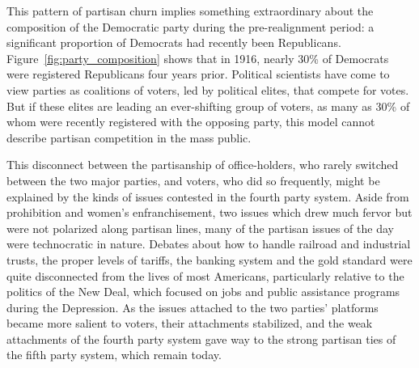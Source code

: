 \documentclass[11pt]{scrartcl}\usepackage[]{graphicx}\usepackage[]{color}
\begin{document}
\FloatBarrier
This pattern of partisan churn implies something extraordinary about the composition of the Democratic party during the pre-realignment period: a significant proportion of Democrats had recently been Republicans. Figure~\ref{fig:party_composition} shows that in 1916, nearly 30\% of Democrats were registered Republicans four years prior. Political scientists have come to view parties as coalitions of voters, led by political elites, that compete for votes. But if these elites are leading an ever-shifting group of voters, as many as 30\% of whom were recently registered with the opposing party, this model cannot describe partisan competition in the mass public. 

This disconnect between the partisanship of office-holders, who rarely switched between the two major parties, and voters, who did so frequently, might be explained by the kinds of issues contested in the fourth party system. Aside from prohibition and women's enfranchisement, two issues which drew much fervor but were not polarized along partisan lines, many of the partisan issues of the day were technocratic in nature. Debates about how to handle railroad and industrial trusts, the proper levels of tariffs, the banking system and the gold standard were quite disconnected from the lives of most Americans, particularly relative to the politics of the New Deal, which focused on jobs and public assistance programs during the Depression. As the issues attached to the two parties' platforms became more salient to voters, their attachments stabilized, and the weak attachments of the fourth party system gave way to the strong partisan ties of the fifth party system, which remain today.
\end{document}
